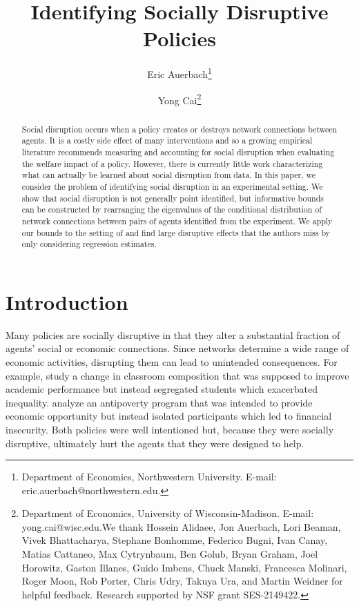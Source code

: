 \documentclass[12pt]{article}
\title{Identifying Socially Disruptive Policies}
\author{Eric Auerbach\footnote{Department of Economics, Northwestern University. E-mail: eric.auerbach@northwestern.edu.} \and Yong Cai\footnote{Department of Economics, University of Wisconsin-Madison. E-mail: yong.cai@wisc.edu.\newline We thank Hossein Alidaee, Jon Auerbach, Lori Beaman, Vivek Bhattacharya, Stephane Bonhomme, Federico Bugni, Ivan Canay, Matias Cattaneo, Max Cytrynbaum, Ben Golub, Bryan Graham, Joel Horowitz, Gaston Illanes, Guido Imbens, Chuck Manski, Francesca Molinari, Roger Moon, Rob Porter, Chris Udry, Takuya Ura, and Martin Weidner  for helpful feedback. Research supported by NSF grant SES-2149422. }}
\date{\parbox{\linewidth}{\centering%
  \today\endgraf}}
\theoremstyle{definition}
\begin{document}
\maketitle

\begin{abstract} \noindent
Social disruption occurs when a policy creates or destroys network connections between agents. It is a costly side effect of many interventions and so a growing empirical literature recommends measuring and accounting for social disruption when evaluating the welfare impact of a policy. However, there is currently little work characterizing what can actually be learned about social disruption from data. In this paper, we consider the problem of identifying social disruption in an experimental setting. We show that social disruption is not generally point identified, but informative bounds can be constructed by rearranging the eigenvalues of the conditional distribution of network connections between pairs of agents identified from the experiment. We apply our bounds to the setting of \cite{banerjee2021changes} and find large disruptive effects that the authors miss by only considering regression estimates.    
\end{abstract}


\section{Introduction}

Many policies are socially disruptive in that they alter a substantial fraction of agents' social or economic connections. Since networks determine a wide range of economic activities, disrupting them can lead to unintended consequences. For example, \cite{carrell2013natural} study a change in classroom composition that was supposed to improve academic performance but instead segregated students which exacerbated inequality. \cite{barnhardt2017moving} analyze an antipoverty program that was intended to provide economic opportunity but instead isolated participants which led to financial insecurity. Both policies were well intentioned but, because they were socially disruptive, ultimately hurt the agents that they were designed to help. 
\end{document}
